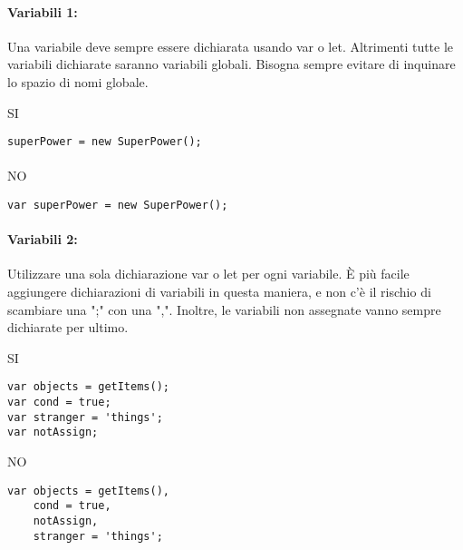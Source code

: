 \documentclass[../processi_primari.tex]{subfiles}
\begin{document}
\paragraph{Variabili 1:}Una variabile deve sempre essere dichiarata usando var o let. Altrimenti tutte le variabili dichiarate saranno variabili globali. Bisogna sempre evitare di inquinare lo spazio di nomi globale. 
\begin{center}{\begin{minipage}{9.5cm}
{\begin{center}SI\end{center}}
\begin{Verbatim}[frame=single]
superPower = new SuperPower();
\end{Verbatim}
\end{minipage}
\paragraph{}
\begin{minipage}{9.5cm}
{\begin{center}NO\end{center}}
\begin{Verbatim}[frame=single]
var superPower = new SuperPower();
\end{Verbatim}
\end{minipage}
}
\end{center}


\paragraph{Variabili 2:}Utilizzare una sola dichiarazione var o let per ogni variabile. È più facile aggiungere dichiarazioni di variabili in questa maniera, e non c'è il rischio di scambiare una ";" con una ",". Inoltre, le variabili non assegnate vanno sempre dichiarate per ultimo. \\


\begin{minipage}{6cm}
	{\begin{center}SI\end{center}}
	\begin{Verbatim}[frame=single]
var objects = getItems();
var cond = true;
var stranger = 'things';
var notAssign;
	\end{Verbatim}
\end{minipage}
\hfill
\begin{minipage}{6.5cm}
	{\begin{center}NO\end{center}}
	\begin{Verbatim}[frame=single]
var objects = getItems(),
	cond = true,
	notAssign,
	stranger = 'things';
	\end{Verbatim}
\end{minipage}
\end{document}
